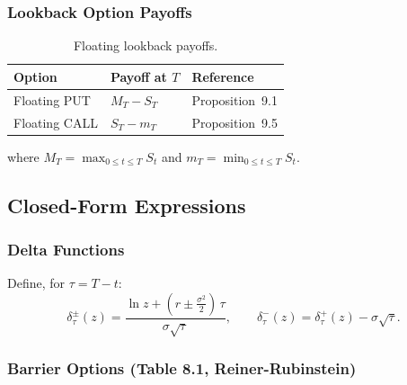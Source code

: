 \documentclass[12pt,a4paper]{article}
\begin{document}
\subsubsection{Lookback Option Payoffs}

\begin{table}[H]
\centering
\caption{Floating lookback payoffs.}
\label{tab:lookback_payoffs}
\begin{tabular}{L{4cm} C{4cm} C{4cm}}
\toprule
\textbf{Option} & \textbf{Payoff at $T$} & \textbf{Reference} \\
\midrule
Floating PUT  & $M_T - S_T$ & Proposition~9.1 \\
Floating CALL & $S_T - m_T$ & Proposition~9.5 \\
\bottomrule
\end{tabular}
\end{table}

where $M_T = \max_{0\le t\le T}S_t$ and $m_T = \min_{0\le t\le T}S_t$.

\subsection{Closed-Form Expressions}

\subsubsection{Delta Functions}

Define, for $\tau = T - t$:
\begin{equation}
  \delta^\pm_\tau(z)
    = \frac{\ln z + (r \pm \tfrac{\sigma^2}{2})\,\tau}{\sigma\sqrt{\tau}},
  \qquad \delta^-_\tau(z) = \delta^+_\tau(z) - \sigma\sqrt{\tau}.
  \label{eq:delta}
\end{equation}

\subsubsection{Barrier Options (Table 8.1, Reiner-Rubinstein)}
\end{document}
